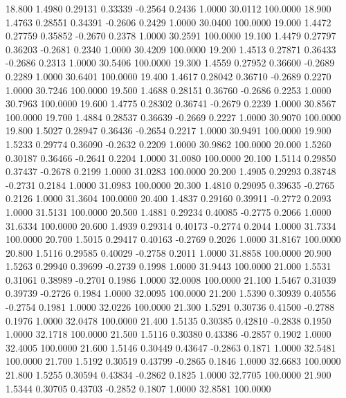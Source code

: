   18.800   1.4980   0.29131   0.33339  -0.2564   0.2436   1.0000  30.0112 100.0000
  18.900   1.4763   0.28551   0.34391  -0.2606   0.2429   1.0000  30.0400 100.0000
  19.000   1.4472   0.27759   0.35852  -0.2670   0.2378   1.0000  30.2591 100.0000
  19.100   1.4479   0.27797   0.36203  -0.2681   0.2340   1.0000  30.4209 100.0000
  19.200   1.4513   0.27871   0.36433  -0.2686   0.2313   1.0000  30.5406 100.0000
  19.300   1.4559   0.27952   0.36600  -0.2689   0.2289   1.0000  30.6401 100.0000
  19.400   1.4617   0.28042   0.36710  -0.2689   0.2270   1.0000  30.7246 100.0000
  19.500   1.4688   0.28151   0.36760  -0.2686   0.2253   1.0000  30.7963 100.0000
  19.600   1.4775   0.28302   0.36741  -0.2679   0.2239   1.0000  30.8567 100.0000
  19.700   1.4884   0.28537   0.36639  -0.2669   0.2227   1.0000  30.9070 100.0000
  19.800   1.5027   0.28947   0.36436  -0.2654   0.2217   1.0000  30.9491 100.0000
  19.900   1.5233   0.29774   0.36090  -0.2632   0.2209   1.0000  30.9862 100.0000
  20.000   1.5260   0.30187   0.36466  -0.2641   0.2204   1.0000  31.0080 100.0000
  20.100   1.5114   0.29850   0.37437  -0.2678   0.2199   1.0000  31.0283 100.0000
  20.200   1.4905   0.29293   0.38748  -0.2731   0.2184   1.0000  31.0983 100.0000
  20.300   1.4810   0.29095   0.39635  -0.2765   0.2126   1.0000  31.3604 100.0000
  20.400   1.4837   0.29160   0.39911  -0.2772   0.2093   1.0000  31.5131 100.0000
  20.500   1.4881   0.29234   0.40085  -0.2775   0.2066   1.0000  31.6334 100.0000
  20.600   1.4939   0.29314   0.40173  -0.2774   0.2044   1.0000  31.7334 100.0000
  20.700   1.5015   0.29417   0.40163  -0.2769   0.2026   1.0000  31.8167 100.0000
  20.800   1.5116   0.29585   0.40029  -0.2758   0.2011   1.0000  31.8858 100.0000
  20.900   1.5263   0.29940   0.39699  -0.2739   0.1998   1.0000  31.9443 100.0000
  21.000   1.5531   0.31061   0.38989  -0.2701   0.1986   1.0000  32.0008 100.0000
  21.100   1.5467   0.31039   0.39739  -0.2726   0.1984   1.0000  32.0095 100.0000
  21.200   1.5390   0.30939   0.40556  -0.2754   0.1981   1.0000  32.0226 100.0000
  21.300   1.5291   0.30736   0.41500  -0.2788   0.1976   1.0000  32.0478 100.0000
  21.400   1.5135   0.30385   0.42810  -0.2838   0.1950   1.0000  32.1718 100.0000
  21.500   1.5116   0.30380   0.43386  -0.2857   0.1902   1.0000  32.4005 100.0000
  21.600   1.5146   0.30449   0.43647  -0.2863   0.1871   1.0000  32.5481 100.0000
  21.700   1.5192   0.30519   0.43799  -0.2865   0.1846   1.0000  32.6683 100.0000
  21.800   1.5255   0.30594   0.43834  -0.2862   0.1825   1.0000  32.7705 100.0000
  21.900   1.5344   0.30705   0.43703  -0.2852   0.1807   1.0000  32.8581 100.0000

